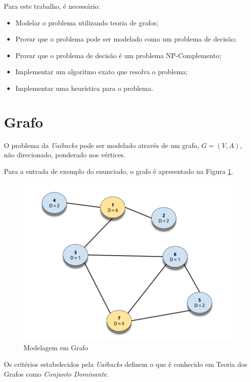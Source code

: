 \documentclass[10pt,a4paper]{article}
\begin{document}
	Para este trabalho, é necessário:

	\begin{itemize}

		\item Modelar o problema utilizando teoria de grafos;
		\item Provar que o problema pode ser modelado como um problema de decisão;
		\item Provar que o problema de decisão é um problema NP-Complemento;
		\item Implementar um algoritmo exato que resolva o problema;
		\item Implementar uma heurística para o problema.

	\end{itemize}

	\section{Grafo}

	O problema da \emph{Uaibucks} pode ser modelado através de um grafo, $G = (V,A)$, não direcionado, ponderado nos vértices.

	Para a entrada de exemplo do enunciado, o grafo é apresentado na Figura \ref{fig_grafo01}.

	\begin{figure}[H]
		\centering
		\caption{Modelagem em Grafo}
		\label{fig_grafo01}
		\includegraphics[scale=0.35]{grafo}
	\end{figure}

	Os critérios estabelecidos pela \emph{Uaibucks} definem o que é conhecido em Teoria dos Grafos como \emph{Conjunto Dominante}.
\end{document}
